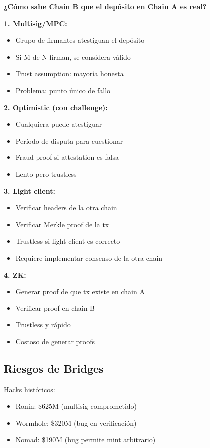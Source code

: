 \documentclass[11pt,a4paper,twoside,openright]{book}
\theoremstyle{definition}
\theoremstyle{plain}
\theoremstyle{remark}
\begin{document}
\begin{keyidea}
\textbf{¿Cómo sabe Chain B que el depósito en Chain A es real?}

\textbf{1. Multisig/MPC:}
\begin{itemize}
    \item Grupo de firmantes atestiguan el depósito
    \item Si M-de-N firman, se considera válido
    \item Trust assumption: mayoría honesta
    \item Problema: punto único de fallo
\end{itemize}

\textbf{2. Optimistic (con challenge):}
\begin{itemize}
    \item Cualquiera puede atestiguar
    \item Período de disputa para cuestionar
    \item Fraud proof si attestation es falsa
    \item Lento pero trustless
\end{itemize}

\textbf{3. Light client:}
\begin{itemize}
    \item Verificar headers de la otra chain
    \item Verificar Merkle proof de la tx
    \item Trustless si light client es correcto
    \item Requiere implementar consenso de la otra chain
\end{itemize}

\textbf{4. ZK:}
\begin{itemize}
    \item Generar proof de que tx existe en chain A
    \item Verificar proof en chain B
    \item Trustless y rápido
    \item Costoso de generar proofs
\end{itemize}
\end{keyidea}

\subsection{Riesgos de Bridges}

Hacks históricos:
\begin{itemize}
    \item Ronin: \$625M (multisig comprometido)
    \item Wormhole: \$320M (bug en verificación)
    \item Nomad: \$190M (bug permite mint arbitrario)
\end{itemize}
\end{document}

